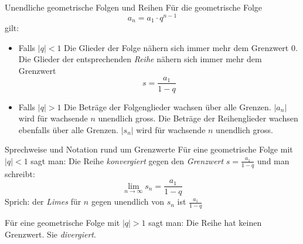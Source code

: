 \begin{satz}{Unendliche geometrische Folgen und Reihen}{}
    Für die geometrische Folge
$$a_n=a_1\cdot q^{n-1}$$
gilt:
\begin{itemize}
    \item 	Falls $|q|<1$ \newline
    Die Glieder der Folge nähern sich immer mehr dem Grenzwert $0$. \newline
    Die Glieder der entsprechenden \emph{Reihe} nähern sich immer mehr dem Grenzwert
    $$ s= \frac{a_1}{1-q}$$
    \item Falls $|q|>1$ \newline
    Die Beträge der Folgenglieder wachsen über alle Grenzen. $|a_n |$ wird für wachsende $n$ unendlich gross.\newline
    Die Beträge der Reihenglieder wachsen ebenfalls über alle Grenzen. $|s_n |$ wird für wachsende $n$ unendlich gross.       
\end{itemize}
\end{satz}
\begin{definition}{Sprechweise und Notation rund um Grenzwerte}{}
Für eine geometrische Folge mit $|q|<1$ sagt man: Die Reihe \emph{konvergiert} gegen den \emph{Grenzwert} $s= \frac{a_1}{1-q}$ und man schreibt:
$$ \lim_{n \rightarrow\infty} s_n = \frac{a_1}{1-q}$$
Sprich: der \emph{Limes} für $n$ gegen unendlich von $s_n$ ist $\frac{a_1}{1-q}$

Für eine geometrische Folge mit $|q|>1$ sagt man: Die Reihe hat keinen Grenzwert. Sie \emph{divergiert}.
\end{definition}
